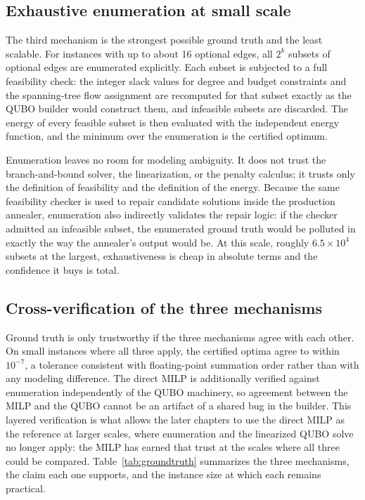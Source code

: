 \subsection{Exhaustive enumeration at small scale}

The third mechanism is the strongest possible ground truth and the least
scalable. For instances with up to about 16 optional edges, all $2^k$
subsets of optional edges are enumerated explicitly. Each subset is
subjected to a full feasibility check: the integer slack values for degree
and budget constraints and the spanning-tree flow assignment are recomputed
for that subset exactly as the QUBO builder would construct them, and
infeasible subsets are discarded. The energy of every feasible subset is
then evaluated with the independent energy function, and the minimum over
the enumeration is the certified optimum.

Enumeration leaves no room for modeling ambiguity. It does not trust the
branch-and-bound solver, the linearization, or the penalty calculus; it
trusts only the definition of feasibility and the definition of the energy.
Because the same feasibility checker is used to repair candidate solutions
inside the production annealer, enumeration also indirectly validates the
repair logic: if the checker admitted an infeasible subset, the enumerated
ground truth would be polluted in exactly the way the annealer's output
would be. At this scale, roughly $6.5 \times 10^4$ subsets at the largest,
exhaustiveness is cheap in absolute terms and the confidence it buys is
total.

\subsection{Cross-verification of the three mechanisms}

Ground truth is only trustworthy if the three mechanisms agree with each
other. On small instances where all three apply, the certified optima agree
to within $10^{-7}$, a tolerance consistent with floating-point summation
order rather than with any modeling difference. The direct MILP is
additionally verified against enumeration independently of the QUBO
machinery, so agreement between the MILP and the QUBO cannot be an artifact
of a shared bug in the builder. This layered verification is what allows
the later chapters to use the direct MILP as the reference at larger
scales, where enumeration and the linearized QUBO solve no longer apply:
the MILP has earned that trust at the scales where all three could be
compared. Table~\ref{tab:groundtruth} summarizes the three mechanisms, the
claim each one supports, and the instance size at which each remains
practical.

